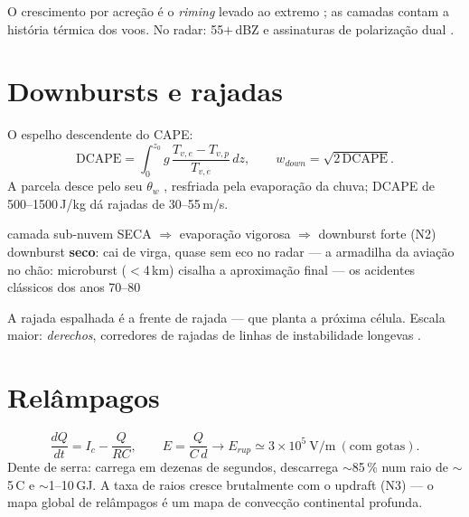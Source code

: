 \documentclass[11pt]{article}
\begin{document}
O crescimento por acreção é o \emph{riming} levado ao extremo
; as camadas contam a história térmica dos voos. No
radar: 55$+$\,dBZ e assinaturas de polarização dual
.

\section{Downbursts e rajadas}\label{sec:down}


\begin{formadif}
O espelho descendente do CAPE:
\[ \mathrm{DCAPE} = \int_0^{z_0} g\,
\frac{T_{v,e} - T_{v,p}}{T_{v,e}}\,dz,
\qquad w_{down} = \sqrt{2\,\mathrm{DCAPE}}. \]
A parcela desce pelo seu $\theta_w$ ,
resfriada pela evaporação da chuva; DCAPE de 500--1500\,J/kg dá
rajadas de 30--55\,m/s.
\end{formadif}

\begin{noquadro}
camada sub-nuvem SECA $\Rightarrow$ evaporação vigorosa $\Rightarrow$
downburst forte (N2)\\
downburst \textbf{seco}: cai de virga, quase sem eco no radar — a
armadilha da aviação\\
no chão: microburst ($<$4\,km) cisalha a aproximação final — os
acidentes clássicos dos anos 70--80
\end{noquadro}

A rajada espalhada é a frente de rajada  —
que planta a próxima célula. Escala maior: \emph{derechos}, corredores
de rajadas de linhas de instabilidade longevas .

\section{Relâmpagos}\label{sec:raios}


\begin{formadif}
\[ \frac{dQ}{dt} = I_c - \frac{Q}{RC},\qquad
E = \frac{Q}{C\,d} \to E_{rup} \simeq 3\times10^5\ \mathrm{V/m}
\ (\text{com gotas}). \]
Dente de serra: carrega em dezenas de segundos, descarrega
$\sim$85\,\% num raio de $\sim$5\,C e $\sim$1--10\,GJ. A taxa de raios
cresce brutalmente com o updraft (N3) — o mapa global de relâmpagos é
um mapa de convecção continental profunda.
\end{formadif}
\end{document}
